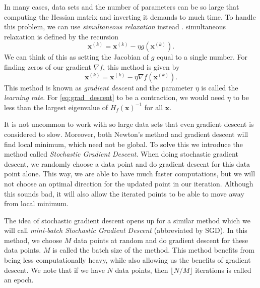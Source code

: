 \documentclass[aps,reprint,superscriptaddress,nofootinbib]{revtex4-2}
\begin{document}
    In many cases, data sets and the number of parameters can be so large that computing the Hessian matrix and inverting it demands to much time. To handle this problem, we can use \textit{simultaneous relaxation} instead \cite{num_anal_mayers}. simultaneous relaxation is defined by the recursion
    \begin{equation*}
        \bm{x}^{(k)}=\bm{x}^{(k)}-\eta g(\bm{x}^{(k)}).
    \end{equation*}
    We can think of this as setting the Jacobian of \(g\) equal to a single number. For finding zeros of our gradient \(\nabla f\), this method is given by
    \begin{equation}\label{eq:grad_descent}
        \bm{x}^{(k)}=\bm{x}^{(k)}-\eta\nabla f(\bm{x}^{(k)}).
    \end{equation}
    This method is known as \textit{gradient descent} and the parameter \(\eta\) is called the \textit{learning rate}. For \eqref{eq:grad_descent} to be a contraction, we would need \(\eta\) to be less than the largest eigenvalue of \(H_f(\bm{x})^{-1}\) for all \(\bm{x}\).
    
    It is not uncommon to work with so large data sets that even gradient descent is considered to slow. Moreover, both Newton's method and gradient descent will find local minimum, which need not be global. To solve this we introduce the method called \textit{Stochastic Gradient Descent}. When doing stochastic gradient descent, we randomly choose a data point and do gradient descent for this data point alone. This way, we are able to have much faster computations, but we will not choose an optimal direction for the updated point in our iteration. Although this sounds bad, it will also allow the iterated points to be able to move away from local minimum. 
    
    The idea of stochastic gradient descent opens up for a similar method which we will call \textit{mini-batch Stochastic Gradient Descent} (abbreviated by SGD). In this method, we choose \(M\) data points at random and do gradient descent for these data points. \(M\) is called the batch size of the method. This method benefits from being less computationally heavy, while also allowing us the benefits of gradient descent. We note that if we have \(N\) data points, then \(\lfloor N / M\rfloor\) iterations is called an epoch.
    
\end{document}
